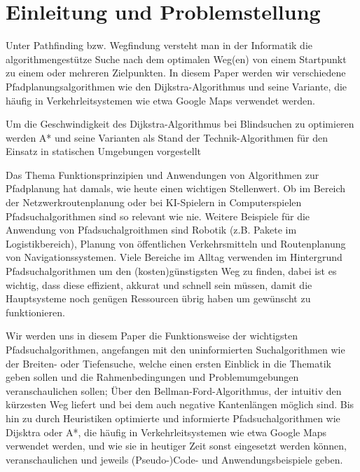 
\chapter{Einleitung und Problemstellung}
\label{Einleitung und Problemstellung}

Unter Pathfinding bzw. Wegfindung versteht man in der Informatik die algorithmengestütze Suche nach dem optimalen Weg(en) 
von einem Startpunkt zu einem oder mehreren Zielpunkten. 
In diesem Paper werden wir verschiedene Pfadplanungsalgorithmen wie den Dijkstra-Algorithmus und seine Variante, 
die häufig in Verkehrleitsystemen wie etwa Google Maps verwendet werden.

Um die Geschwindigkeit des Dijkstra-Algorithmus bei Blindsuchen zu optimieren werden A* und seine Varianten als Stand der Technik-Algorithmen 
für den Einsatz in statischen Umgebungen vorgestellt \cite{Karur:21}

Das Thema Funktionsprinzipien und Anwendungen von Algorithmen zur Pfadplanung hat damals, wie heute einen wichtigen Stellenwert. 
Ob im Bereich der Netzwerkroutenplanung oder bei KI-Spielern in Computerspielen Pfadsuchalgorithmen sind so relevant wie nie. 
Weitere Beispiele für die Anwendung von Pfadsuchalgroithmen sind Robotik (z.B. Pakete im Logistikbereich), Planung von öffentlichen 
Verkehrsmitteln und Routenplanung von Navigationssystemen. 
Viele Bereiche im Alltag verwenden im Hintergrund Pfadsuchalgorithmen um den (kosten)günstigsten Weg zu finden, dabei ist es wichtig, 
dass diese effizient, akkurat und schnell sein müssen, 
damit die Hauptsysteme noch genügen Ressourcen übrig haben um gewünscht zu funktionieren. \cite{Foeada:21}

Wir werden uns in diesem Paper die Funktionsweise der wichtigsten Pfadsuchalgorithmen, angefangen mit den uninformierten Suchalgorithmen wie der Breiten- oder Tiefensuche, 
welche einen ersten Einblick in die Thematik geben sollen und die Rahmenbedingungen und Problemumgebungen veranschaulichen sollen; 
Über den Bellman-Ford-Algorithmus, der intuitiv den kürzesten Weg liefert und bei dem auch negative Kantenlängen möglich sind.\cite{Mukhlif:20}
Bis hin zu durch Heuristiken optimierte und informierte Pfadsuchalgorithmen wie Dijsktra oder A*, 
die häufig in Verkehrleitsystemen wie etwa Google Maps verwendet werden, und wie sie in heutiger Zeit 
sonst eingesetzt werden können, veranschaulichen und jeweils (Pseudo-)Code- und Anwendungsbeispiele geben.\cite{Russell:10a}
